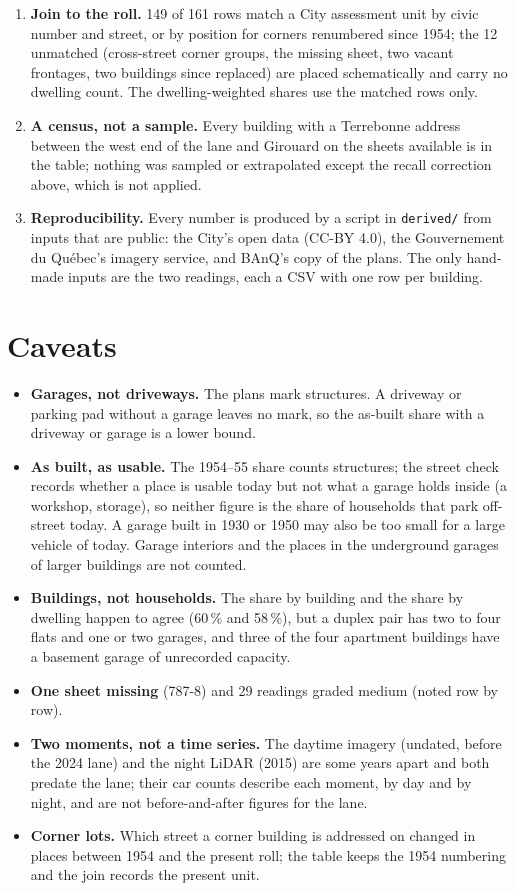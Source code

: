 \documentclass[11pt]{article}
\begin{document}
\begin{enumerate}
\item \textbf{Join to the roll.} 149 of 161 rows match a City assessment unit by civic number and street, or by position for corners renumbered since 1954; the 12 unmatched (cross-street corner groups, the missing sheet, two vacant frontages, two buildings since replaced) are placed schematically and carry no dwelling count. The dwelling-weighted shares use the matched rows only.
\item \textbf{A census, not a sample.} Every building with a Terrebonne address between the west end of the lane and Girouard on the sheets available is in the table; nothing was sampled or extrapolated except the recall correction above, which is not applied.
\item \textbf{Reproducibility.} Every number is produced by a script in \texttt{derived/} from inputs that are public: the City's open data (CC-BY 4.0), the Gouvernement du Qu\'ebec's imagery service, and BAnQ's copy of the plans. The only hand-made inputs are the two readings, each a CSV with one row per building.
\end{enumerate}

\section{Caveats}
\begin{itemize}
\item \textbf{Garages, not driveways.} The plans mark structures. A driveway or parking pad without a garage leaves no mark, so the as-built share with a driveway or garage is a lower bound.
\item \textbf{As built, as usable.} The 1954--55 share counts structures; the street check records whether a place is usable today but not what a garage holds inside (a workshop, storage), so neither figure is the share of households that park off-street today. A garage built in 1930 or 1950 may also be too small for a large vehicle of today. Garage interiors and the places in the underground garages of larger buildings are not counted.
\item \textbf{Buildings, not households.} The share by building and the share by dwelling happen to agree (60\,\% and 58\,\%), but a duplex pair has two to four flats and one or two garages, and three of the four apartment buildings have a basement garage of unrecorded capacity.
\item \textbf{One sheet missing} (787-8) and 29 readings graded medium (noted row by row).
\item \textbf{Two moments, not a time series.} The daytime imagery (undated, before the 2024 lane) and the night LiDAR (2015) are some years apart and both predate the lane; their car counts describe each moment, by day and by night, and are not before-and-after figures for the lane.
\item \textbf{Corner lots.} Which street a corner building is addressed on changed in places between 1954 and the present roll; the table keeps the 1954 numbering and the join records the present unit.
\end{itemize}
\end{document}
